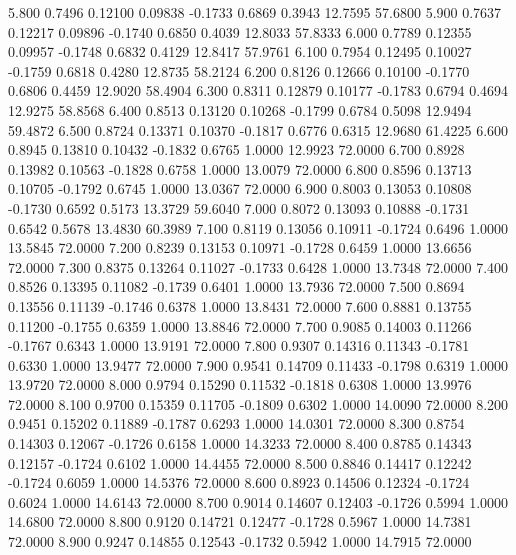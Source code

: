    5.800   0.7496   0.12100   0.09838  -0.1733   0.6869   0.3943  12.7595  57.6800
   5.900   0.7637   0.12217   0.09896  -0.1740   0.6850   0.4039  12.8033  57.8333
   6.000   0.7789   0.12355   0.09957  -0.1748   0.6832   0.4129  12.8417  57.9761
   6.100   0.7954   0.12495   0.10027  -0.1759   0.6818   0.4280  12.8735  58.2124
   6.200   0.8126   0.12666   0.10100  -0.1770   0.6806   0.4459  12.9020  58.4904
   6.300   0.8311   0.12879   0.10177  -0.1783   0.6794   0.4694  12.9275  58.8568
   6.400   0.8513   0.13120   0.10268  -0.1799   0.6784   0.5098  12.9494  59.4872
   6.500   0.8724   0.13371   0.10370  -0.1817   0.6776   0.6315  12.9680  61.4225
   6.600   0.8945   0.13810   0.10432  -0.1832   0.6765   1.0000  12.9923  72.0000
   6.700   0.8928   0.13982   0.10563  -0.1828   0.6758   1.0000  13.0079  72.0000
   6.800   0.8596   0.13713   0.10705  -0.1792   0.6745   1.0000  13.0367  72.0000
   6.900   0.8003   0.13053   0.10808  -0.1730   0.6592   0.5173  13.3729  59.6040
   7.000   0.8072   0.13093   0.10888  -0.1731   0.6542   0.5678  13.4830  60.3989
   7.100   0.8119   0.13056   0.10911  -0.1724   0.6496   1.0000  13.5845  72.0000
   7.200   0.8239   0.13153   0.10971  -0.1728   0.6459   1.0000  13.6656  72.0000
   7.300   0.8375   0.13264   0.11027  -0.1733   0.6428   1.0000  13.7348  72.0000
   7.400   0.8526   0.13395   0.11082  -0.1739   0.6401   1.0000  13.7936  72.0000
   7.500   0.8694   0.13556   0.11139  -0.1746   0.6378   1.0000  13.8431  72.0000
   7.600   0.8881   0.13755   0.11200  -0.1755   0.6359   1.0000  13.8846  72.0000
   7.700   0.9085   0.14003   0.11266  -0.1767   0.6343   1.0000  13.9191  72.0000
   7.800   0.9307   0.14316   0.11343  -0.1781   0.6330   1.0000  13.9477  72.0000
   7.900   0.9541   0.14709   0.11433  -0.1798   0.6319   1.0000  13.9720  72.0000
   8.000   0.9794   0.15290   0.11532  -0.1818   0.6308   1.0000  13.9976  72.0000
   8.100   0.9700   0.15359   0.11705  -0.1809   0.6302   1.0000  14.0090  72.0000
   8.200   0.9451   0.15202   0.11889  -0.1787   0.6293   1.0000  14.0301  72.0000
   8.300   0.8754   0.14303   0.12067  -0.1726   0.6158   1.0000  14.3233  72.0000
   8.400   0.8785   0.14343   0.12157  -0.1724   0.6102   1.0000  14.4455  72.0000
   8.500   0.8846   0.14417   0.12242  -0.1724   0.6059   1.0000  14.5376  72.0000
   8.600   0.8923   0.14506   0.12324  -0.1724   0.6024   1.0000  14.6143  72.0000
   8.700   0.9014   0.14607   0.12403  -0.1726   0.5994   1.0000  14.6800  72.0000
   8.800   0.9120   0.14721   0.12477  -0.1728   0.5967   1.0000  14.7381  72.0000
   8.900   0.9247   0.14855   0.12543  -0.1732   0.5942   1.0000  14.7915  72.0000
